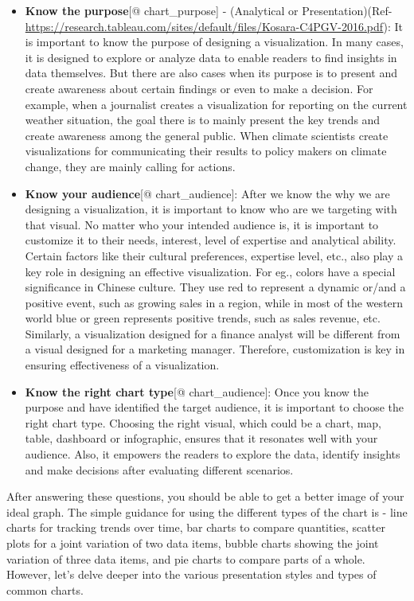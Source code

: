 \documentclass[]{book}
\providecommand{\tightlist}{%
  \setlength{\itemsep}{0pt}\setlength{\parskip}{0pt}}
\begin{document}
\begin{itemize}
\tightlist
\item
  \textbf{Know the purpose}{[}@ chart\_purpose{]} - (Analytical or
  Presentation)(Ref-\url{https://research.tableau.com/sites/default/files/Kosara-C4PGV-2016.pdf}):
  It is important to know the purpose of designing a visualization. In
  many cases, it is designed to explore or analyze data to enable
  readers to find insights in data themselves. But there are also cases
  when its purpose is to present and create awareness about certain
  findings or even to make a decision. For example, when a journalist
  creates a visualization for reporting on the current weather
  situation, the goal there is to mainly present the key trends and
  create awareness among the general public. When climate scientists
  create visualizations for communicating their results to policy makers
  on climate change, they are mainly calling for actions.
\item
  \textbf{Know your audience}{[}@ chart\_audience{]}: After we know the
  why we are designing a visualization, it is important to know who are
  we targeting with that visual. No matter who your intended audience
  is, it is important to customize it to their needs, interest, level of
  expertise and analytical ability. Certain factors like their cultural
  preferences, expertise level, etc., also play a key role in designing
  an effective visualization. For eg., colors have a special
  significance in Chinese culture. They use red to represent a dynamic
  or/and a positive event, such as growing sales in a region, while in
  most of the western world blue or green represents positive trends,
  such as sales revenue, etc. Similarly, a visualization designed for a
  finance analyst will be different from a visual designed for a
  marketing manager. Therefore, customization is key in ensuring
  effectiveness of a visualization.
\item
  \textbf{Know the right chart type}{[}@ chart\_audience{]}: Once you
  know the purpose and have identified the target audience, it is
  important to choose the right chart type. Choosing the right visual,
  which could be a chart, map, table, dashboard or infographic, ensures
  that it resonates well with your audience. Also, it empowers the
  readers to explore the data, identify insights and make decisions
  after evaluating different scenarios.
\end{itemize}

After answering these questions, you should be able to get a better
image of your ideal graph. The simple guidance for using the different
types of the chart is - line charts for tracking trends over time, bar
charts to compare quantities, scatter plots for a joint variation of two
data items, bubble charts showing the joint variation of three data
items, and pie charts to compare parts of a whole. However, let's delve
deeper into the various presentation styles and types of common charts.
\end{document}
